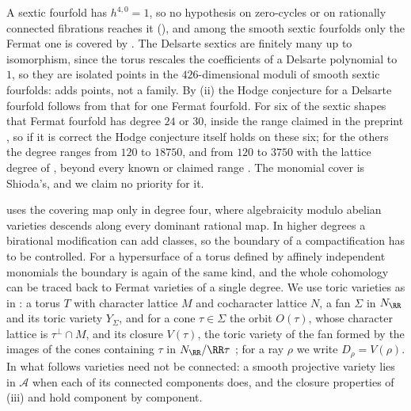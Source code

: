 A sextic fourfold has $h^{4,0}=1$, so no hypothesis on zero-cycles or on
rationally connected fibrations reaches it (), and
among the smooth sextic fourfolds only the Fermat one is covered by
. The Delsarte sextics are finitely many
up to isomorphism, since the torus rescales the coefficients of a Delsarte
polynomial to $1$, so they are isolated points in the $426$-dimensional
moduli of smooth sextic fourfolds:  adds points, not a
family. By (ii) the Hodge conjecture for a Delsarte
fourfold follows from that for one Fermat fourfold. For six of the sextic
shapes that Fermat fourfold has degree $24$ or $30$, inside the range claimed
in the preprint \cite{MMMV26}, so if it is correct the Hodge conjecture
itself holds on these six; for the others the degree ranges from $120$ to
$18750$, and from $120$ to $3750$ with the lattice degree of
, beyond every known or claimed range
\cite{Shi79b,MMMV26,Jum26}.
The monomial cover is Shioda's, and we claim no priority for it.

 uses the covering map only in degree four, where
algebraicity modulo abelian varieties descends along every dominant rational
map. In higher degrees a birational modification can add classes, so the
boundary of a compactification has to be controlled. For a hypersurface of a
torus defined by affinely independent monomials the boundary is again of the
same kind, and the whole cohomology can be traced back to Fermat varieties
of a single degree. We use toric varieties as in \cite{CLS11}: a torus $T$
with character lattice $M$ and cocharacter lattice $N$, a fan $\Sigma$ in
$N_{\RR}$ and its toric variety $Y_{\Sigma}$, and for a cone
$\tau\in\Sigma$ the orbit $O(\tau)$, whose character lattice is
$\tau^{\perp}\cap M$, and its closure $V(\tau)$, the toric variety of the
fan formed by the images of the cones containing $\tau$ in
$N_{\RR}/\RR\tau$ \cite[Chapter~3]{CLS11}; for a ray $\rho$ we write
$D_{\rho}=V(\rho)$. In what follows varieties need not be connected: a
smooth projective variety lies in $\mathcal{A}$ when each of its connected
components does, and the closure properties of (iii) and
 hold component by component.


